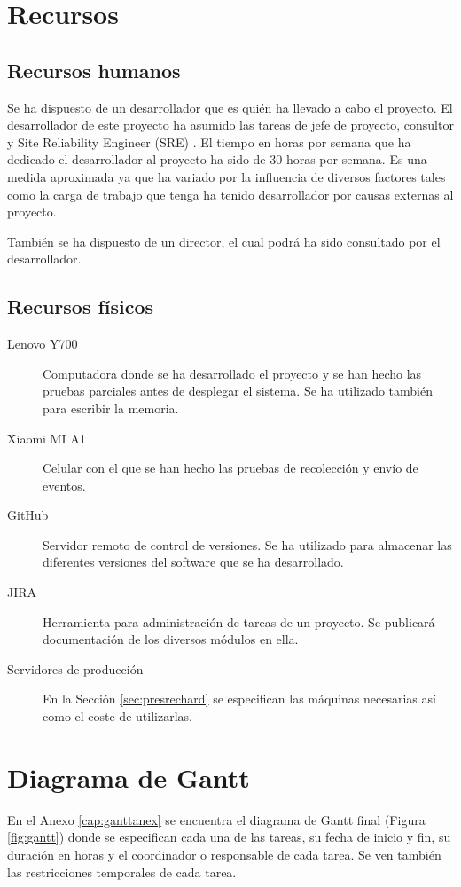 \section{Recursos}
\subsection{Recursos humanos}
Se ha dispuesto de un desarrollador que es quién ha llevado a cabo el proyecto. El desarrollador de este proyecto ha asumido las tareas de jefe de proyecto, consultor y Site Reliability Engineer (SRE) \cite{Tfg:sre}. El tiempo en horas por semana que ha dedicado el desarrollador al proyecto ha sido de 30 horas por semana. Es una medida aproximada ya que ha variado por la influencia de diversos factores tales como la carga de trabajo que tenga ha tenido desarrollador por causas externas al proyecto.

También se ha dispuesto de un director, el cual podrá ha sido consultado por el desarrollador.

\subsection{Recursos físicos}\label{cap:recfis}
\begin{description}

	\item [Lenovo Y700] Computadora donde se ha desarrollado el proyecto y se han hecho las pruebas parciales antes de desplegar el sistema. Se ha utilizado también para escribir la memoria.
	
	\item [Xiaomi MI A1] Celular con el que se han hecho las pruebas de recolección y envío de eventos.
	
	\item [GitHub] Servidor remoto de control de versiones. Se ha utilizado para almacenar las diferentes versiones del software que se ha desarrollado.
	
	\item [JIRA] Herramienta para administración de tareas de un proyecto. Se publicará documentación de los diversos módulos en ella.
	
	\item [Servidores de producción] En la Sección \ref{sec:presrechard} se especifican las máquinas necesarias así como el coste de utilizarlas.
\end{description}

\section{Diagrama de Gantt}\label{cap:gantt}
En el Anexo \ref{cap:ganttanex} se encuentra el diagrama de Gantt final (Figura \ref{fig:gantt}) donde se especifican cada una de las tareas, su fecha de inicio y fin, su duración en horas y el coordinador o responsable de cada tarea. Se ven también las restricciones temporales de cada tarea.

